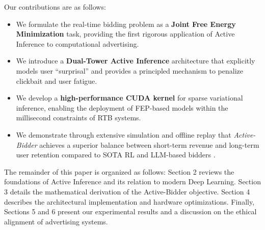 Our contributions are as follows:
\begin{itemize}
    \item We formulate the real-time bidding problem as a \textbf{Joint Free Energy Minimization} task, providing the first rigorous application of Active Inference to computational advertising.
    \item We introduce a \textbf{Dual-Tower Active Inference} architecture that explicitly models user ``surprisal'' and provides a principled mechanism to penalize clickbait and user fatigue.
    \item We develop a \textbf{high-performance CUDA kernel} for sparse variational inference, enabling the deployment of FEP-based models within the millisecond constraints of RTB systems.
    \item We demonstrate through extensive simulation and offline replay \citep{liu2023medtime} that \textit{Active-Bidder} achieves a superior balance between short-term revenue and long-term user retention compared to SOTA RL and LLM-based bidders \citep{zhao2023survey, achiam2023gpt}.
\end{itemize}

The remainder of this paper is organized as follows: Section 2 reviews the foundations of Active Inference and its relation to modern Deep Learning. Section 3 details the mathematical derivation of the Active-Bidder objective. Section 4 describes the architectural implementation and hardware optimizations. Finally, Sections 5 and 6 present our experimental results and a discussion on the ethical alignment of advertising systems.
